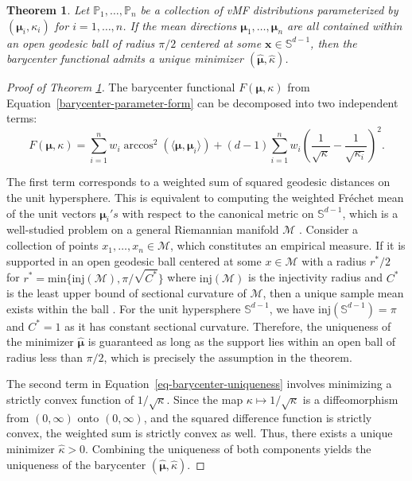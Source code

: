 \documentclass[10pt]{article}
\newtheorem{theorem}{Theorem}[section]
\newcommand{\bfx}{\boldsymbol{x}}
\newcommand{\bfmu}{\boldsymbol{\mu}}
\newcommand{\bbP}{\mathbb{P}}
\newcommand{\bbS}{\mathbb{S}}
\newcommand{\calM}{\mathcal{M}}
\newcommand{\Frechet}{Fr\'{e}chet }
\begin{document}
\begin{theorem}\label{theorem-barycenter-uniqueness}
	Let $\bbP_1, \ldots, \bbP_n$ be a collection of vMF distributions parameterized by $(\bfmu_i, \kappa_i)$ for $i = 1, \ldots, n$. If the mean directions $\bfmu_1, \ldots, \bfmu_n$ are all contained within an open geodesic ball of radius $\pi/2$ centered at some $\bfx \in \bbS^{d-1}$, then the barycenter functional admits a unique minimizer $(\hat{\bfmu}, \hat{\kappa})$.
\end{theorem}
\begin{proof}[Proof of Theorem \ref{theorem-barycenter-uniqueness}]
	The barycenter functional $F(\bfmu, \kappa)$ from Equation~\eqref{barycenter-parameter-form} can be decomposed into two independent terms: 
	\begin{equation}\label{eq-barycenter-uniqueness}
		F(\bfmu, \kappa) = \sum_{i=1}^n w_i \arccos^2 (\langle \bfmu, \bfmu_i \rangle) + (d-1) \sum_{i=1}^n w_i \left(\frac{1}{\sqrt{\kappa}} - \frac{1}{\sqrt{\kappa_i}}\right)^2.
	\end{equation}
	
	The first term corresponds to a weighted sum of squared geodesic distances on the unit hypersphere. This is equivalent to computing the weighted \Frechet mean of the unit vectors $\bfmu_i's$ with respect to the canonical metric on $\bbS^{d-1}$, which is a well-studied problem on a general Riemannian manifold $\calM$ \citep{kendall_1990_ProbabilityConvexityHarmonic}. Consider a collection of points $x_1, \ldots, x_n \in \calM$, which constitutes an empirical measure. If it is supported in an open geodesic ball centered at some $x \in \calM$ with a radius $r^*/2$ for $r^* = \textrm{min} \lbrace \textrm{inj}(\calM), \pi/\sqrt{C^*}\rbrace $ where $\textrm{inj}(\mathcal{M})$ is the injectivity radius and $C^*$ is the least upper bound of sectional curvature of $\calM$, then a unique sample mean exists within the ball \citep{bhattacharya_2012_NonparametricInferenceManifolds}. For the unit hypersphere $\bbS^{d-1}$, we have $\mathrm{inj}(\bbS^{d-1}) = \pi$ and $C^* = 1$ as it has constant sectional curvature. Therefore, the uniqueness of the minimizer $\hat{\bfmu}$ is guaranteed as long as the support lies within an open ball of radius less than $\pi/2$, which is precisely the assumption in the theorem.
	
	The second term in Equation~\eqref{eq-barycenter-uniqueness} involves minimizing a strictly convex function of $1/\sqrt{\kappa}$. Since the map $\kappa \mapsto 1/\sqrt{\kappa}$ is a diffeomorphism from $(0,\infty)$ onto $(0,\infty)$, and the squared difference function is strictly convex, the weighted sum is strictly convex as well. Thus, there exists a unique minimizer $\hat{\kappa} > 0$. Combining the uniqueness of both components yields the uniqueness of the barycenter $(\hat{\bfmu}, \hat{\kappa})$.
\end{proof}
\end{document}

